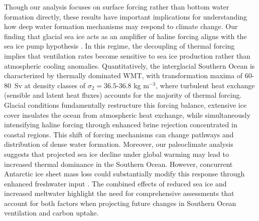 \documentclass[draft]{agujournal2025}
\begin{document}
Though our analysis focuses on surface forcing rather than bottom water formation directly, these results have important implications for understanding how deep water formation mechanisms may respond to climate change. Our finding that glacial sea ice acts as an amplifier of haline forcing aligns with the sea ice pump hypothesis \citep{Abernathey2016}. In this regime, the decoupling of thermal forcing implies that ventilation rates become sensitive to sea ice production rather than atmospheric cooling anomalies. Quantitatively, the interglacial Southern Ocean is characterized by thermally dominated WMT, with transformation maxima of 60-80~Sv at density classes of $\sigma_2 = 36.5$-$36.8$ kg m$^{-3}$, where turbulent heat exchange (sensible and latent heat fluxes) accounts for the majority of thermal forcing. Glacial conditions fundamentally restructure this forcing balance, extensive ice cover insulates the ocean from atmospheric heat exchange, while simultaneously intensifying haline forcing through enhanced brine rejection concentrated in coastal regions. This shift of forcing mechanisms can change pathways and distribution of dense water formation. Moreover, our paleoclimate analysis suggests that projected sea ice decline under global warming may lead to increased thermal dominance in the Southern Ocean.  However, concurrent Antarctic ice sheet mass loss could substantially modify this response through enhanced freshwater input \citep{Li2023Nature,Silvano2018}. The combined effects of reduced sea ice and increased meltwater highlight the need for comprehensive  assessments that account for both factors when projecting future changes in Southern Ocean ventilation and carbon uptake.
\end{document}
